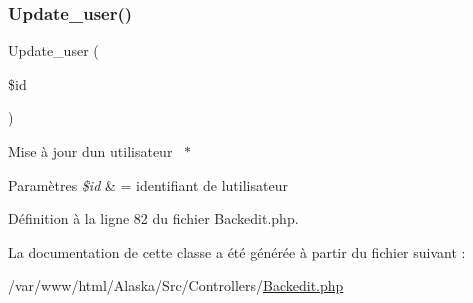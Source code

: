 \subsubsection{\texorpdfstring{Update\+\_\+user()}{Update\_user()}}
{\footnotesize\ttfamily Update\+\_\+user (\begin{DoxyParamCaption}\item[{}]{\$id }\end{DoxyParamCaption})}

Mise à jour d\textquotesingle{}un utilisateur  $\ast$
\begin{DoxyParams}{Paramètres}
{\em \$id} & = identifiant de l\textquotesingle{}utilisateur \\
\hline
\end{DoxyParams}


Définition à la ligne 82 du fichier Backedit.\+php.



La documentation de cette classe a été générée à partir du fichier suivant \+:\begin{DoxyCompactItemize}
\item 
/var/www/html/\+Alaska/\+Src/\+Controllers/\hyperlink{_backedit_8php}{Backedit.\+php}\end{DoxyCompactItemize}
